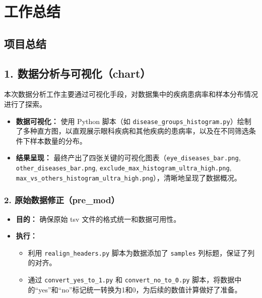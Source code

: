 \documentclass[UTF8]{report}
\theoremstyle{MyLineTheoremStyle} %
\theoremstyle{MyBlockTheoremStyle} %
\theoremstyle{MySubsubsectionStyle} %
\begin{document}
\chapter{工作总结}

\section{项目总结}
\section*{1. 数据分析与可视化（chart）}
本次数据分析工作主要通过可视化手段，对数据集中的疾病患病率和样本分布情况进行了探索。

\begin{itemize}
    \item \textbf{数据可视化：} 使用 Python 脚本（如 \texttt{disease\_groups\_histogram.py}）绘制了多种直方图，以直观展示眼科疾病和其他疾病的患病率，以及在不同筛选条件下样本数量的分布。
    \item \textbf{结果呈现：} 最终产出了四张关键的可视化图表（\texttt{eye\_diseases\_bar.png}, \texttt{other\_diseases\_bar.png}, \texttt{exclude\_max\_histogram\_ultra\_high.png}, \texttt{max\_vs\_others\_histogram\_ultra\_high.png}），清晰地呈现了数据概况。
\end{itemize}


\subsection*{2. 原始数据修正（pre\_mod）}
\begin{itemize}
    \item \textbf{目的：} 确保原始 tsv 文件的格式统一和数据可用性。
    \item \textbf{执行：}
    \begin{itemize}
        \item 利用 \texttt{realign\_headers.py} 脚本为数据添加了 \texttt{samples} 列标题，保证了列的对齐。
        \item 通过 \texttt{convert\_yes\_to\_1.py} 和 \texttt{convert\_no\_to\_0.py} 脚本，将数据中的“yes”和“no”标记统一转换为1和0，为后续的数值计算做好了准备。
    \end{itemize}
\end{itemize}
\end{document}

